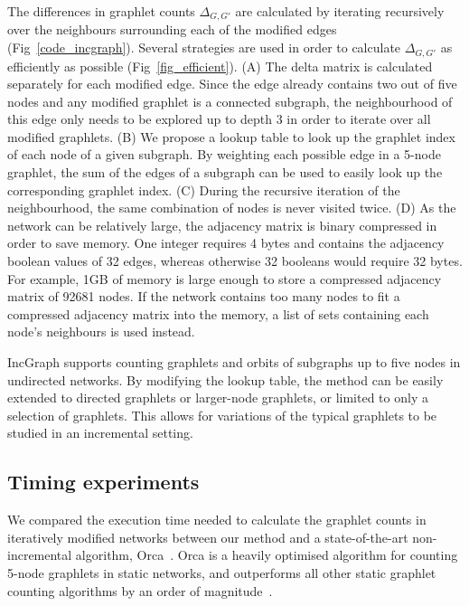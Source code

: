 The differences in graphlet counts $\Delta_{G, G'}$ are calculated by iterating recursively over the neighbours surrounding each of the modified edges (Fig~\ref{code_incgraph}). Several strategies are used in order to calculate $\Delta_{G,G'}$ as efficiently as possible (Fig~\ref{fig_efficient}).
(A) The delta matrix is calculated separately for each modified edge. Since the edge already contains two out of five nodes and any modified graphlet is a connected subgraph, the neighbourhood of this edge only needs to be explored up to depth 3 in order to iterate over all modified graphlets. 
(B) We propose a lookup table to look up the graphlet index of each node of a given subgraph. By weighting each possible edge in a 5-node graphlet, the sum of the edges of a subgraph can be used to easily look up the corresponding graphlet index.
(C) During the recursive iteration of the neighbourhood, the same combination of nodes is never visited twice.
(D) As the network can be relatively large, the adjacency matrix is binary compressed in order to save memory. One integer requires 4 bytes and contains the adjacency boolean values of 32 edges, whereas otherwise 32 booleans would require 32 bytes. For example, 1GB of memory is large enough to store a compressed adjacency matrix of 92681 nodes. If the network contains too many nodes to fit a compressed adjacency matrix into the memory, a list of sets containing each node's neighbours is used instead.




IncGraph supports counting graphlets and orbits of subgraphs up to five nodes in undirected networks. By modifying the lookup table, the method can be easily extended to directed graphlets or larger-node graphlets, or limited to only a selection of graphlets. This allows for variations of the typical graphlets to be studied in an incremental setting.

\subsection*{Timing experiments}
We compared the execution time needed to calculate the graphlet counts in iteratively modified networks between our method and a state-of-the-art non-incremental algorithm, Orca~\cite{hocevar_combinatorialapproachgraphlet_2014}. Orca is a heavily optimised algorithm for counting 5-node graphlets in static networks, and outperforms all other static graphlet counting algorithms by an order of magnitude~\cite{hocevar_combinatorialapproachgraphlet_2014}.

